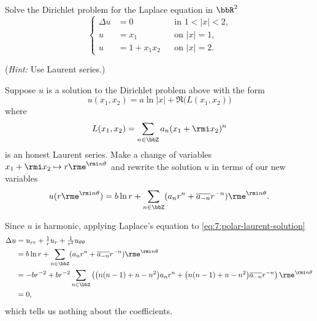 \begin{problem}
  Solve the Dirichlet problem for the Laplace equation in \(\bbR^2\)
  \[
    \left\{
      \begin{aligned}
        \Delta u&=0&&\text{in \(1<|x|<2\),}\\
        u&=x_1&&\text{on \(|x|=1\),}\\
        u&=1+x_1x_2&&\text{on \(|x|=2\).}
      \end{aligned}
    \right.
  \]

  \noindent (\emph{Hint:} Use Laurent series.)
\end{problem}
\begin{solution}
  Suppose \(u\) is a solution to the Dirichlet problem above with the form
  \[
    u(x_1,x_2)=a\ln|x|+\Re\bigl(L(x_1,x_2)\bigr)
  \]
  where
  \[
    L(x_1,x_2)=\sum_{n\in\bbZ} a_n(x_1+\rmi x_2)^n
  \]
  is an honest Laurent series. Make a change of variables
  \(x_1+\rmi x_2\mapsto r\rme^{\rmi n\theta}\) and rewrite the solution \(u\)
  in terms of our new variables
  \begin{equation}
    \label{eq:7:polar-laurent-solution}
    u(r\rme^{\rmi n\theta})
    =b\ln r+\sum_{n\in\bbZ} (a_n r^n+\overline{a_{-n}}r^{-n})\rme^{\rmi n\theta}.
  \end{equation}


  Since \(u\) is harmonic, applying Laplace's equation to
  \eqref{eq:7:polar-laurent-solution}
  \begin{align*}
    \Delta u
     &=u_{rr}+\tfrac{1}{r}u_r+\tfrac{1}{r^2}u_{\theta\theta}\\
     &=b\ln r+\sum_{n\in\bbZ} (a_n r^n+\overline{a_{-n}}r^{-n})\rme^{\rmi
       n\theta}\\
     &=-br^{-2}+br^{-2}
       \sum_{n\in\bbZ}
      \left(
      \bigl(n(n-1)+n-n^2\bigr)a_nr^n
      +\bigl(n(n-1)+n-n^2\bigr)\overline{a_{-n}}r^{-n}\right)\rme^{\rmi
       n\theta}\\
    &=0,
  \end{align*}
  which tells us nothing about the coefficients.
\end{solution}
\newpage


